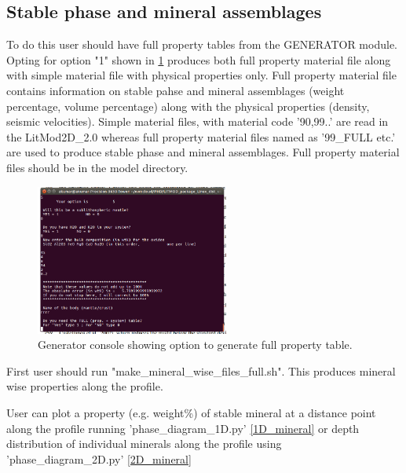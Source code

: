 \documentclass[14pt]{article}
\begin{document}
\subsection{Stable phase and mineral assemblages}
To do this user should have full property tables from the GENERATOR module. Opting for option "1" shown in \ref{mat} produces both full property material file along with simple material file with physical properties only. Full property material file contains information on stable pahse and mineral assemblages (weight percentage, volume percentage) along with the physical properties (density, seismic velocities). Simple material files, with material code '90,99..' are read in the LitMod2D\_2.0 whereas full property material files named as '99\_FULL etc.' are used to produce stable phase and mineral assemblages. Full property material files should be in the model directory.
\begin{figure}
\centering \includegraphics[width=15pc]{./genrator_full_properties.png}
\caption{Generator console showing option to generate full property table.}
\label{mat}
\end{figure}

First user should run "make\_mineral\_wise\_files\_full.sh". This produces mineral wise properties along the profile. 
 
User can plot a property (e.g. weight\%) of stable mineral at a distance point along the profile running 'phase\_diagram\_1D.py' \ref{1D_mineral} or depth distribution of individual minerals along the profile using 'phase\_diagram\_2D.py' \ref{2D_mineral}
\end{document}

